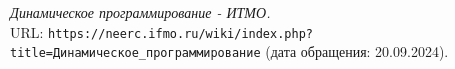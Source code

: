 \begin{thebibliography}{99}
    {\itshape Динамическое программирование - ИТМО.} \\URL: \texttt{https://neerc.ifmo.ru/wiki/index.php?title=Динамическое\_программирование} (дата обращения: 20.09.2024).
    \end{thebibliography}
    \pagebreak
    
    
    